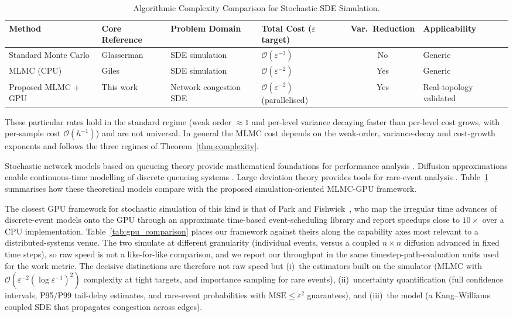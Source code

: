 \documentclass{ieeeaccess}
\begin{document}
\begin{table}[!t]
\caption{Algorithmic Complexity Comparison for Stochastic SDE Simulation.}
\label{tab:complexity}
\centering\footnotesize
\begin{tabular}{llllcl}
\toprule
Method & Core Reference & Problem Domain & Total Cost ($\varepsilon$ target) & Var.\ Reduction & Applicability \\
\midrule
Standard Monte Carlo & Glasserman \cite{glasserman2003monte} & SDE simulation &
$\mathcal{O}(\varepsilon^{-3})$ & No & Generic \\
MLMC (CPU) & Giles \cite{giles2008multilevel,giles2015multilevel} & SDE simulation &
$\mathcal{O}(\varepsilon^{-2})$ & Yes & Generic \\
Proposed MLMC + GPU & This work & Network congestion SDE &
$\mathcal{O}(\varepsilon^{-2})$ (parallelised) & Yes & Real-topology validated \\
\bottomrule
\end{tabular}

\vspace{2pt}
{\footnotesize These particular rates hold in the standard regime (weak order ${\approx}1$ and
per-level variance decaying faster than per-level cost grows, with per-sample cost
$\mathcal{O}(h^{-1})$) and are not universal. In general the MLMC cost depends on the weak-order,
variance-decay and cost-growth exponents and follows the three regimes of
Theorem~\ref{thm:complexity}.}
\end{table}

Stochastic network models based on queueing theory provide mathematical foundations for
performance analysis \cite{kelly2011stochastic,whitt2002}. Diffusion approximations enable
continuous-time modelling of discrete queueing systems \cite{kang2007,harrison1985}.
Large deviation theory provides tools for rare-event analysis \cite{chatterjee2017}.
Table~\ref{tab:complexity} summarises how these theoretical models compare with the proposed
simulation-oriented MLMC-GPU framework.

The closest GPU framework for stochastic simulation of this kind is that of Park and
Fishwick~\cite{park2010gpu}, who map the irregular time advances of discrete-event models onto the
GPU through an approximate time-based event-scheduling library and report speedups close to
$10\times$ over a CPU implementation. Table~\ref{tab:gpu_comparison} places our framework against
theirs along the capability axes most relevant to a distributed-systems venue. The two simulate
at different granularity (individual events, versus a coupled $n{\times}n$ diffusion advanced in
fixed time steps), so raw speed is not a like-for-like comparison, and we report our throughput
in the same timestep-path-evaluation units used for the work metric. The decisive distinctions
are therefore not raw speed but (i)~the estimators built on the simulator (MLMC with
$\mathcal{O}(\varepsilon^{-2}(\log\varepsilon^{-1})^2)$ complexity at tight targets, and
importance sampling for rare events), (ii)~uncertainty quantification (full confidence intervals,
P95/P99 tail-delay estimates, and rare-event probabilities with $\mathrm{MSE}\leq\varepsilon^2$
guarantees), and (iii)~the model (a Kang--Williams coupled SDE that propagates congestion across
edges).
\end{document}
